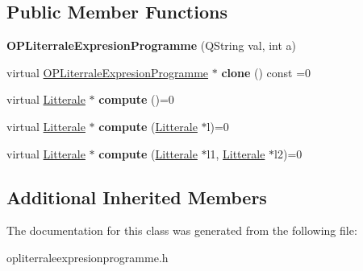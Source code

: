 \subsection*{Public Member Functions}
\begin{DoxyCompactItemize}
\item 
{\bfseries O\+P\+Literrale\+Expresion\+Programme} (Q\+String val, int a)\hypertarget{class_o_p_literrale_expresion_programme_a2da09e01e37ec756976bc910bbcb799a}{}\label{class_o_p_literrale_expresion_programme_a2da09e01e37ec756976bc910bbcb799a}

\item 
virtual \hyperlink{class_o_p_literrale_expresion_programme}{O\+P\+Literrale\+Expresion\+Programme} $\ast$ {\bfseries clone} () const  =0\hypertarget{class_o_p_literrale_expresion_programme_a7172e6b3d9d2849dcc220085ae5d8316}{}\label{class_o_p_literrale_expresion_programme_a7172e6b3d9d2849dcc220085ae5d8316}

\item 
virtual \hyperlink{class_litterale}{Litterale} $\ast$ {\bfseries compute} ()=0\hypertarget{class_o_p_literrale_expresion_programme_ae6b8a97924a17ec536a2f810beb0ee01}{}\label{class_o_p_literrale_expresion_programme_ae6b8a97924a17ec536a2f810beb0ee01}

\item 
virtual \hyperlink{class_litterale}{Litterale} $\ast$ {\bfseries compute} (\hyperlink{class_litterale}{Litterale} $\ast$l)=0\hypertarget{class_o_p_literrale_expresion_programme_ad763f93ec588b6b80932aee8e44e98cc}{}\label{class_o_p_literrale_expresion_programme_ad763f93ec588b6b80932aee8e44e98cc}

\item 
virtual \hyperlink{class_litterale}{Litterale} $\ast$ {\bfseries compute} (\hyperlink{class_litterale}{Litterale} $\ast$l1, \hyperlink{class_litterale}{Litterale} $\ast$l2)=0\hypertarget{class_o_p_literrale_expresion_programme_a3a2fb496deae841a35adef5194d61aed}{}\label{class_o_p_literrale_expresion_programme_a3a2fb496deae841a35adef5194d61aed}

\end{DoxyCompactItemize}
\subsection*{Additional Inherited Members}


The documentation for this class was generated from the following file\+:\begin{DoxyCompactItemize}
\item 
opliterraleexpresionprogramme.\+h\end{DoxyCompactItemize}
